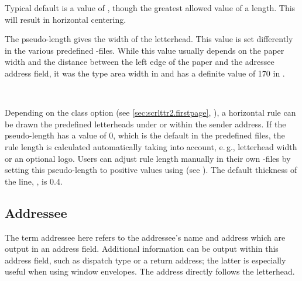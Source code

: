 Typical default is a value of
, though the greatest allowed value of
a length. This will result in horizontal centering.%
%
%


\begin{Declaration}
\end{Declaration}
%
The pseudo-length  gives the width of the
letterhead. This value is set differently in the various predefined
-files.
While this value usually depends on the paper width and the distance between
the left edge of the paper and the adressee address field, it was the type
area width in  and has a definite value of 170 in
.%
%
%


\begin{Declaration}
  \\
\end{Declaration}
%
%
Depending on the class option  (see
\autoref{sec:scrlttr2.firstpage},
), a horizontal rule can be drawn
the predefined letterheads under or within the sender
address. If the pseudo-length  has
a value of 0, which is the default in the predefined 
files, the rule length is calculated automatically taking into account,
e.\,g., letterhead width or an optional logo. Users can adjust rule length
manually in their own -files by setting this pseudo-length to
positive values using \Macro{\@setplength} (see
). The default thickness of
the line, , is
0.4.%
%
%
%
%
%


\subsection{Addressee}
\label{sec:scrlttr2-experts.addressee}%

The term addressee here refers to the addressee's name and address which
are output in an address field. Additional information can be output
within this address field, such as dispatch type or a return address;
the latter is especially useful when using window envelopes. The
address directly follows the letterhead.

